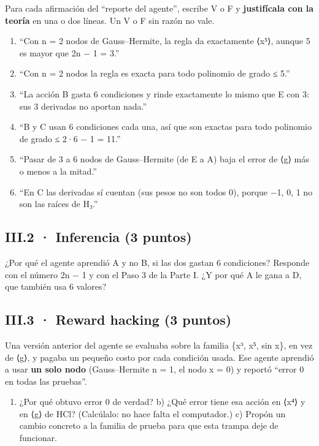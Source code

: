 Para cada afirmación del ``reporte del agente'', escribe V o F y \textbf{justifícala con la teoría} en una o dos líneas. Un V o F sin razón no vale.

\begin{enumerate}
\def\labelenumi{\arabic{enumi}.}
\tightlist
\item
  ``Con n = 2 nodos de Gauss--Hermite, la regla da exactamente ⟨x⁵⟩, aunque 5 es mayor que 2n − 1 = 3.''
\item
  ``Con n = 2 nodos la regla es exacta para todo polinomio de grado ≤ 5.''
\item
  ``La acción B gasta 6 condiciones y rinde exactamente lo mismo que E con 3: sus 3 derivadas no aportan nada.''
\item
  ``B y C usan 6 condiciones cada una, así que son exactas para todo polinomio de grado ≤ 2·6 − 1 = 11.''
\item
  ``Pasar de 3 a 6 nodos de Gauss--Hermite (de E a A) baja el error de ⟨g⟩ más o menos a la mitad.''
\item
  ``En C las derivadas sí cuentan (sus pesos no son todos 0), porque −1, 0, 1 no son las raíces de H₃.''
\end{enumerate}

\subsection{III.2 · Inferencia (3 puntos)}

¿Por qué el agente aprendió A y no B, si las dos gastan 6 condiciones? Responde con el número 2n − 1 y con el Paso 3 de la Parte I. ¿Y por qué A le gana a D, que también usa 6 valores?



\subsection{III.3 · Reward hacking (3 puntos)}

Una versión anterior del agente se evaluaba sobre la familia \{x³, x⁵, sin x\}, en vez de ⟨g⟩, y pagaba un pequeño costo por cada condición usada. Ese agente aprendió a usar \textbf{un solo nodo} (Gauss--Hermite n = 1, el nodo x = 0) y reportó ``error 0 en todas las pruebas''.

\begin{enumerate}
\def\labelenumi{\alph{enumi})}
\tightlist
\item
  ¿Por qué obtuvo error 0 de verdad? b) ¿Qué error tiene esa acción en ⟨x⁴⟩ y en ⟨g⟩ de HCl? (Calcúlalo: no hace falta el computador.) c) Propón un cambio concreto a la familia de prueba para que esta trampa deje de funcionar.
\end{enumerate}

